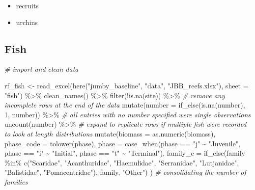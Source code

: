 \documentclass[
]{article}
\newenvironment{Shaded}{\begin{snugshade}}{\end{snugshade}}
\newcommand{\AttributeTok}[1]{\textcolor[rgb]{0.77,0.63,0.00}{#1}}
\newcommand{\CommentTok}[1]{\textcolor[rgb]{0.56,0.35,0.01}{\textit{#1}}}
\newcommand{\DecValTok}[1]{\textcolor[rgb]{0.00,0.00,0.81}{#1}}
\newcommand{\FunctionTok}[1]{\textcolor[rgb]{0.00,0.00,0.00}{#1}}
\newcommand{\NormalTok}[1]{#1}
\newcommand{\OtherTok}[1]{\textcolor[rgb]{0.56,0.35,0.01}{#1}}
\newcommand{\SpecialCharTok}[1]{\textcolor[rgb]{0.00,0.00,0.00}{#1}}
\newcommand{\StringTok}[1]{\textcolor[rgb]{0.31,0.60,0.02}{#1}}
\providecommand{\tightlist}{%
  \setlength{\itemsep}{0pt}\setlength{\parskip}{0pt}}
\begin{document}
\begin{itemize}
\tightlist
\item
  recruits
\item
  urchins
\end{itemize}

\hypertarget{fish}{%
\subsection{Fish}\label{fish}}

\begin{Shaded}
\begin{Highlighting}[]
\CommentTok{\# import and clean data}

\NormalTok{rf\_fish }\OtherTok{\textless{}{-}} \FunctionTok{read\_excel}\NormalTok{(}\FunctionTok{here}\NormalTok{(}\StringTok{"jumby\_baseline"}\NormalTok{, }\StringTok{"data"}\NormalTok{, }\StringTok{"JBB\_reefs.xlsx"}\NormalTok{), }\AttributeTok{sheet =} \StringTok{"fish"}\NormalTok{) }\SpecialCharTok{\%\textgreater{}\%}  
  \FunctionTok{clean\_names}\NormalTok{() }\SpecialCharTok{\%\textgreater{}\%}
  \FunctionTok{filter}\NormalTok{(}\SpecialCharTok{!}\FunctionTok{is.na}\NormalTok{(site)) }\SpecialCharTok{\%\textgreater{}\%} \CommentTok{\# remove any incomplete rows at the end of the data}
  \FunctionTok{mutate}\NormalTok{(}\AttributeTok{number =} \FunctionTok{if\_else}\NormalTok{(}\FunctionTok{is.na}\NormalTok{(number), }\DecValTok{1}\NormalTok{, number)) }\SpecialCharTok{\%\textgreater{}\%} \CommentTok{\# all entries with no number specified were single observations}
  \FunctionTok{uncount}\NormalTok{(number) }\SpecialCharTok{\%\textgreater{}\%} \CommentTok{\# expand to replicate rows if multiple fish were recorded to look at length distributions}
  \FunctionTok{mutate}\NormalTok{(}\AttributeTok{biomass =} \FunctionTok{as.numeric}\NormalTok{(biomass),}
         \AttributeTok{phase\_code =} \FunctionTok{tolower}\NormalTok{(phase),}
         \AttributeTok{phase =} \FunctionTok{case\_when}\NormalTok{(phase }\SpecialCharTok{==} \StringTok{"j"} \SpecialCharTok{\textasciitilde{}} \StringTok{"Juvenile"}\NormalTok{,}
\NormalTok{                           phase }\SpecialCharTok{==} \StringTok{"i"} \SpecialCharTok{\textasciitilde{}} \StringTok{"Initial"}\NormalTok{,}
\NormalTok{                           phase }\SpecialCharTok{==} \StringTok{"t"} \SpecialCharTok{\textasciitilde{}} \StringTok{"Terminal"}\NormalTok{),}
         \AttributeTok{family\_c =} \FunctionTok{if\_else}\NormalTok{(family }\SpecialCharTok{\%in\%} \FunctionTok{c}\NormalTok{(}\StringTok{"Scaridae"}\NormalTok{, }\StringTok{"Acanthuridae"}\NormalTok{, }\StringTok{"Haemulidae"}\NormalTok{, }\StringTok{"Serranidae"}\NormalTok{, }\StringTok{"Lutjanidae"}\NormalTok{, }\StringTok{"Balistidae"}\NormalTok{, }\StringTok{"Pomacentridae"}\NormalTok{), family, }\StringTok{"Other"}\NormalTok{)}
\NormalTok{         ) }\CommentTok{\# consolidating the number of families}
\end{Highlighting}
\end{Shaded}
\end{document}
